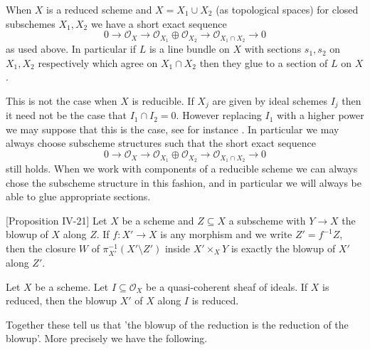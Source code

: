 \documentclass[a4paper,12pt]{book}
\newcommand{\ox}[1][X]{\mathcal{O}_{#1}}
\begin{document}
\begin{remark}\label{powers}
	
	When $X$ is a reduced scheme and $X=X_{1} \cup X_{2}$ (as topological spaces) for closed subschemes $X_{1},X_{2}$ we have a short exact sequence 
	\[0 \to \ox \to \ox[X_{1}]\oplus \ox[X_{2}] \to \ox[X_{1}\cap X_{2}] \to 0\]
	as used above. In particular if $L$ is a line bundle on $X$ with sections $s_{1},s_{2}$ on $X_{1},X_{2}$ respectively which agree on $X_{1}\cap X_{2}$ then they glue to a section of $L$ on $X$.
	
	This is not the case when $X$ is reducible. If $X_{j}$ are given by ideal schemes $I_{j}$ then it need not be the case that $I_{1} \cap I_{2} = 0$. However replacing $I_{1}$ with a higher power we may suppose that this is the case, see for instance \cite[Tag 01YC]{stacks-project}. In particular we may always choose subscheme structures such that the short exact sequence
	\[0 \to \ox \to \ox[X_{1}]\oplus \ox[X_{2}] \to \ox[X_{1}\cap X_{2}] \to 0\]
	still holds. When we work with components of a reducible scheme we can always chose the subscheme structure in this fashion, and in particular we will always be able to glue appropriate sections.
	
\end{remark}

\begin{lemma}\label{Blowup-close}\cite{eisenbud2006geometry}[Proposition IV-21]
	Let $X$ be a scheme and $Z \subseteq X$ a subscheme with $Y \to X$ the blowup of $X$ along $Z$. If $f:X' \to X$ is any morphism and we write $Z'=f^{-1}Z$, then the closure $W$ of $\pi_{X'}^{-1}(X'\setminus Z')$ inside $X' \times_{X} Y$ is exactly the blowup of $X'$ along $Z'$.
\end{lemma}

\begin{lemma}\label{Blowup-red}\cite[Tag 0808]{stacks-project}
	Let $X$ be a scheme. Let $I\subseteq \ox$ be a quasi-coherent sheaf of ideals. If $X$ is reduced, then the blowup $X'$ of $X$ along $I$ is reduced.
	
\end{lemma}

Together these tell us that 'the blowup of the reduction is the reduction of the blowup'. More precisely we have the following.
\end{document}
